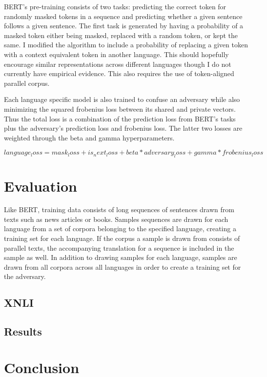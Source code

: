 \documentclass[12pt,letterpaper]{article}
\begin{document}
\begin{multicols}{2}
BERT’s pre-training consists of two tasks: predicting the correct token for randomly masked tokens in a sequence and predicting whether a given sentence follows a given sentence.  The first task is generated by having a probability of a masked token either being masked, replaced with a random token, or kept the same.  I modified the algorithm to include a probability of replacing a given token with a context equivalent token in another language. This should hopefully encourage similar representations across different languages though I do not currently have empirical evidence.  This also requires the use of token-aligned parallel corpus.

Each language specific model is also trained to confuse an adversary while also minimizing the squared frobenius loss between its shared and private vectors.  Thus the total loss is a combination of the prediction loss from BERT’s tasks plus the adversary’s prediction loss and frobenius loss.  The latter two losses are weighted through the beta and gamma hyperparameters.

$language_loss = mask_loss + is_next_loss + beta * adversary_loss + gamma * frobenius_loss$

\section{Evaluation}
Like BERT, training data consists of long sequences of sentences drawn from texts such as news articles or books.  Samples sequences are drawn for each language from a set of corpora belonging to the specified language, creating a training set for each language.  If the corpus a sample is drawn from consists of parallel texts, the accompanying translation for a sequence is included in the sample as well.  In addition to drawing samples for each language, samples are drawn from all corpora across all languages in order to create a training set for the adversary.

\subsection{XNLI}
\lipsum[1]

\subsection{Results}
\lipsum[1]

\section{Conclusion}
\lipsum[1]

\nocite{*}


\end{multicols}
\end{document}

